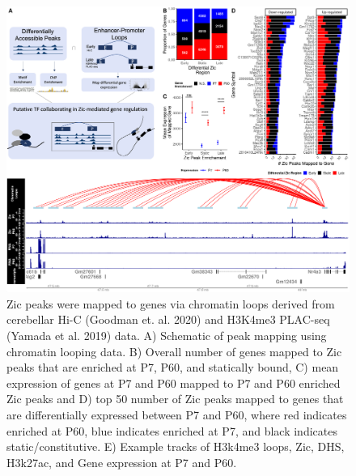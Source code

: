 \documentclass[fleqn,10pt]{wlscirep}
\begin{document}
\begin{figure}[!ht]
\includegraphics[width=.95\textwidth]{../figures/figure3.png}
\caption{Zic peaks were mapped to genes via chromatin loops derived from cerebellar Hi-C (Goodman et. al. 2020)\cite{Goodman2020TheBrain} and H3K4me3 PLAC-seq (Yamada et al. 2019)\cite{Yamada2019SensoryLearning} data. A) Schematic of peak mapping using chromatin looping data. B) Overall number of genes mapped to Zic peaks that are enriched at P7, P60, and statically bound, C) mean expression of genes at P7 and P60 mapped to P7 and P60 enriched Zic peaks and D) top 50 number of Zic peaks mapped to genes that are differentially expressed between P7 and P60, where red indicates enriched at P60, blue indicates enriched at P7, and black indicates static/constitutive. E) Example tracks of H3k4me3 loops, Zic, DHS, H3k27ac, and Gene expression at P7 and P60.}
\label{fig:peakMapping}
\end{figure}
\end{document}
